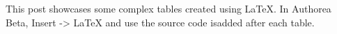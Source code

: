 This post showcases some complex tables created using LaTeX. In Authorea Beta, Insert -> LaTeX and use the source code isadded after each table.

\newline